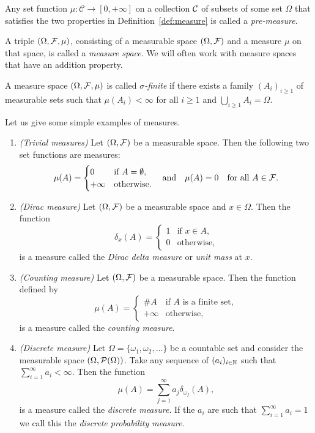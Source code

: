 Any set function $\mu : \mathcal{C} \to [0,+\infty]$ on a collection $\mathcal C$ of subsets of some set $\Omega$ that satisfies the two properties in Definition~\ref{def:measure} is called a \emph{pre-measure}.

A triple $(\Omega, \mathcal F, \mu)$, consisting of a measurable space $(\Omega, \mathcal F)$ and a measure $\mu$ on that space, is called a \emph{measure space}. We will often work with measure spaces that have an addition property.

\begin{definition}\label{def:sigma-finite}
A measure space $(\Omega, \mathcal F, \mu)$ is called \emph{$\sigma$-finite} if there exists a family $(A_i)_{i \ge 1}$ of measurable sets such that $\mu(A_i) < \infty$ for all $i \ge 1$ and $\bigcup_{i \ge 1} A_i = \Omega$.
\end{definition}

Let us give some simple examples of measures.

\begin{example}
\hfil
\begin{enumerate}
\item \textit{(Trivial measures)} Let $(\Omega, \mathcal F)$ be a measurable space. Then the following two set functions are measures:
\[
	\mu(A) = \begin{cases}
		0 &\text{if } A = \emptyset, \\
		+\infty &\text{otherwise.}
	\end{cases}
	\quad \text{and} \quad
	\mu(A) = 0 \quad \text{for all } A \in \mathcal F.
\]
\item \textit{(Dirac measure)} Let $(\Omega, \mathcal F)$ be a measurable space and $x \in \Omega$. Then the function
\[
	\delta_x(A) = \begin{cases}
		1 &\text{if } x \in A, \\
		0 &\text{otherwise},
	\end{cases}
\]
is a measure called the \emph{Dirac delta measure} or \emph{unit mass} at $x$.
\item \textit{(Counting measure)} Let $(\Omega, \mathcal F)$ be a measurable space. Then the function defined by
\[
	\mu(A) = \begin{cases}
		\# A &\text{if $A$ is a finite set},\\
		+\infty &\text{otherwise}, 
	\end{cases}
\]
is a measure called the \emph{counting measure}.
\item \textit{(Discrete measure)} Let $\Omega = \{\omega_1, \omega_2, \dots\}$ be a countable set and consider the measurable space $(\Omega, \mathcal P(\Omega))$. Take any sequence of $(a_i)_{i \in \mathbb N}$ such that $\sum_{i = 1}^\infty a_i < \infty$. Then the function
\[
	\mu(A) = \sum_{j = 1}^\infty a_j \delta_{\omega_j}(A),
\]
is a measure called the \emph{discrete measure}. If the $a_i$ are such that $\sum_{i = 1}^\infty a_i = 1$ we call this the \emph{discrete probability measure}.
\end{enumerate}
\end{example}

